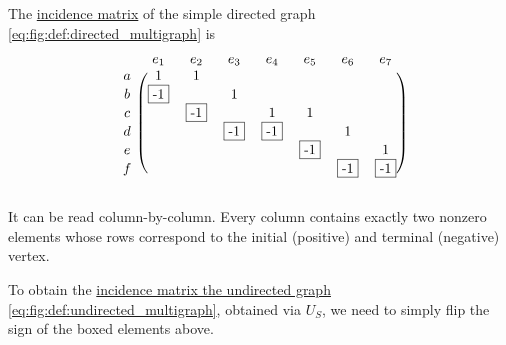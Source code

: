 \begin{example}\label{ex:incidence_matrices}
  The \hyperref[def:directed_incidence_matrix]{incidence matrix} of the simple directed graph \eqref{eq:fig:def:directed_multigraph} is
  \begin{equation}\label{eq:ex:incidence_matrices/directed}
    \begin{blockarray}{cccccccc}
        & e_1       & e_2       & e_3       & e_4       & e_5       & e_6       & e_7       \\
      \begin{block}{c(ccccccc)}
      a & 1         & 1         &           &           &           &           &           \\
      b & \fbox{-1} &           & 1         &           &           &           &           \\
      c &           & \fbox{-1} &           & 1         & 1         &           &           \\
      d &           &           & \fbox{-1} & \fbox{-1} &           & 1         &           \\
      e &           &           &           &           & \fbox{-1} &           & 1         \\
      f &           &           &           &           &           & \fbox{-1} & \fbox{-1} \\
      \end{block}
    \end{blockarray}
  \end{equation}

  It can be read column-by-column. Every column contains exactly two nonzero elements whose rows correspond to the initial (positive) and terminal (negative) vertex.

  To obtain the \hyperref[def:undirected_incidence_matrix]{incidence matrix the undirected graph} \eqref{eq:fig:def:undirected_multigraph}, obtained via \hyperref[def:graph_functors/multi_forgetful]{\( U_S \)}, we need to simply flip the sign of the boxed elements above.


\end{example}

